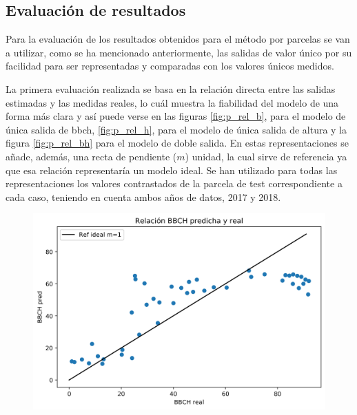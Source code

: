 \subsection{Evaluación de resultados}
\par Para la evaluación de los resultados obtenidos para el método por parcelas se van a utilizar, como se ha mencionado anteriormente, las salidas de valor único por su facilidad para ser representadas y comparadas con los valores únicos medidos. 
\\
\par La primera evaluación realizada se basa en la relación directa entre las salidas estimadas y las medidas reales, lo cuál muestra la fiabilidad del modelo de una forma más clara y así puede verse en las figuras \ref{fig:p_rel_b}, para el modelo de única salida de \gls{bbch}, \ref{fig:p_rel_h}, para el modelo de única salida de altura y la figura \ref{fig:p_rel_bh} para el modelo de doble salida. En estas representaciones se añade, además, una recta de pendiente ($m$) unidad, la cual sirve de referencia ya que esa relación representaría un modelo ideal. Se han utilizado para todas las representaciones los valores contrastados de la parcela de test correspondiente a cada caso, teniendo en cuenta ambos años de datos, 2017 y 2018.
\begin{figure}[h]
\centering
\includegraphics[width=0.95\linewidth]{archivos/tfg/Pixel/BBCH_RELACION_BIEN}
\end{figure}
